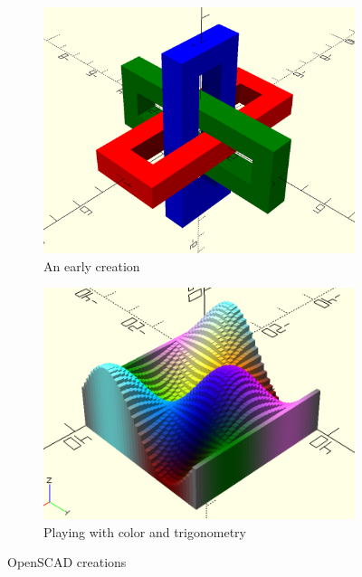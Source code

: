 \documentclass[12pt,twoside]{reedthesis}
\begin{document}
	\begin{figure}[H]
	\centering
	\begin{subfigure}{0.48\linewidth}
		\centering
		\includegraphics[width=\linewidth]{Images/OpenSCAD1}
		\caption{An early creation}
		\label {ThreeHollowRects}
	\end{subfigure}%
	\hfill
	\begin{subfigure}{0.48\linewidth}
		\centering
		\includegraphics[width=\linewidth]{Images/OpenSCAD2}
		\caption{Playing with color and trigonometry}
		\label {3dSine}
	\end{subfigure}
	\caption{OpenSCAD creations}
	\label{OpenSCAD}
	\end{figure}
	
\end{document}
